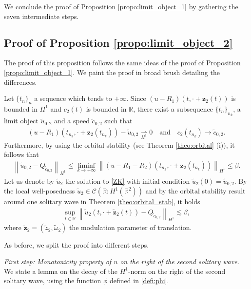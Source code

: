 \documentclass[reqno,10pt]{amsart}
\numberwithin{equation}{section}
\newcommand{\bz}{\mathbf{z}}
\begin{document}
		We conclude the proof of Proposition \ref{propo:limit_object_1} by gathering the seven intermediate steps.
		

	
	\subsection{Proof of Proposition \ref{propo:limit_object_2}}
		The proof of this proposition follows the same ideas of the proof of Proposition \ref{propo:limit_object_1}. We paint the proof in broad brush detailing the differences. 
		
		Let $\{t_n\}_n$ a sequence which tends to $+\infty$. Since $ \left(u -R_1 \right)(t,\cdot +\bz_2(t))$ is bounded in $H^1$ and $c_2(t)$ is bounded in $\mathbb{R}$, there exist a subsequence $\{t_n\}_{n_k}$, a limit object $\tilde{u}_{0,2}$ and a speed $\tilde{c}_{0,2}$ such that
		\begin{align*}
			\left( u -R_1 \right) \left(t_{n_k}, \cdot + \bz_2(t_{n_k}) \right)- \tilde{u}_{0,2} \underset{H^1}{\rightharpoonup} 0 \quad \text{and} \quad c_2(t_{n_k}) \rightarrow \tilde{c}_{0,2}.
		\end{align*}
	Furthermore, by using the orbital stability (see Theorem \ref{theo:orbital} (i)), it follows that
	\begin{align*}
		\left\| \tilde{u}_{0,2} - Q_{\tilde{c}_{0,2}} \right\|_{H^1} \leq \liminf_{k \to +\infty} \left\| \left( u -R_1 -R_2 \right) \left(t_{n_k}, \cdot + \bz_2(t_{n_k}) \right) \right\|_{H^1} \leq \beta. 
	\end{align*}
Let us denote  by $\tilde{u}_2$ the solution to \ref{ZK} with initial condition $\tilde{u}_{2}(0) = \tilde{u}_{0,2}$. By the local well-posedness $\tilde{u}_{2}\in \mathcal{C}\left( \mathbb{R} : H^1(\mathbb{R}^2) \right)$ and by the orbital stability result around one solitary wave in Theorem \ref{theo:orbital_stab}, it holds
\begin{align*}
	\sup_{t \in \mathbb{R}} \left\| \tilde{u}_2(t, \cdot + \tilde{\bz}_2(t)) -Q_{\tilde{c}_{0,2}}\right\|_{H^1} \lesssim \beta, 
\end{align*}
where $\tilde{\bz}_2=(\tilde{z}_2,\tilde{\omega}_2)$ the modulation parameter of translation. 

As before, we split the proof into different steps.


\vspace{0.5cm}
\noindent\textit{First step: Monotonicity property of $u$ on the right of the second solitary wave.}
We state a lemma on the decay of the $H^1$-norm on the right of the second solitary wave, using the function $\phi$ defined in \eqref{defi:phi}.
\end{document}
